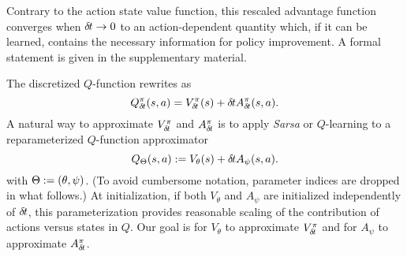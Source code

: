 Contrary to the action state value function,
this
rescaled advantage function converges when ${\delta\hspace{-.1em}t}\to 0$
to an action-dependent quantity which, if it can be learned, contains the
necessary information for policy improvement. A formal statement is given in the supplementary material.




The discretized $Q$-function rewrites as
\begin{equation}
	Q^\pi_{\delta\hspace{-.1em}t}(s, a) = V^\pi_{\delta\hspace{-.1em}t}(s) + {\delta\hspace{-.1em}t} A^\pi_{\delta\hspace{-.1em}t}(s, a).
	\label{eq:reparam_q_pi}
\end{equation}
A natural way to approximate $V^\pi_{\delta\hspace{-.1em}t}$ and $A^\pi_{\delta\hspace{-.1em}t}$ is to apply
\emph{Sarsa} or $Q$-learning to a reparameterized $Q$-function approximator
\begin{equation}
	Q_\Theta(s, a) \mathrel{\mathop{:}}= V_{\theta}(s) + {\delta\hspace{-.1em}t} A_{\psi}(s, a).
\end{equation}
with $\Theta \mathrel{\mathop{:}}= (\theta, \psi)$. (To avoid cumbersome notation, 
parameter indices are dropped in what follows.)  At initialization, if both $V_{\theta}$ and
$A_{\psi}$ are initialized independently of ${\delta\hspace{-.1em}t}$, this parameterization
provides reasonable scaling of the contribution of actions versus states
in $Q$.
Our goal is for $V_\theta$ to approximate $V^\pi_{\delta\hspace{-.1em}t}$ and for
$A_{\psi}$ to approximate $A^\pi_{\delta\hspace{-.1em}t}$.


